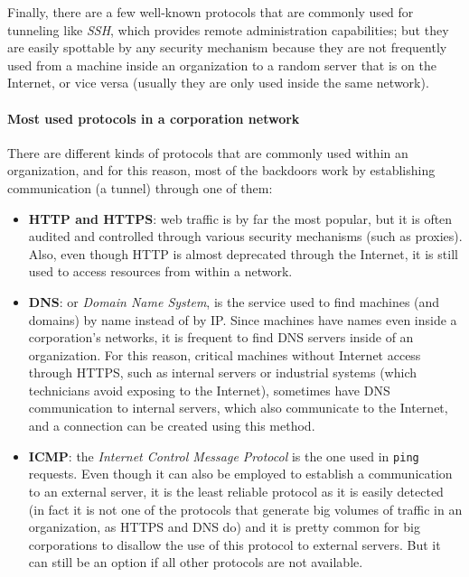 Finally, there are a few well-known protocols that are commonly used for tunneling like \textit{SSH}, which provides remote administration capabilities; but they are easily spottable by any security mechanism because they are not frequently used from a machine inside an organization to a random server that is on the Internet, or vice versa (usually they are only used inside the same network).

\pagebreak
\paragraph{Most used protocols in a corporation network}

There are different kinds of protocols that are commonly used within an organization, and for this reason, most of the backdoors work by establishing communication (a tunnel) through one of them:
\begin{itemize}
\renewcommand{\labelitemi}{\localtextbulletone}
\item \textbf{HTTP and HTTPS}: web traffic is by far the most popular, but it is often audited and controlled through various security mechanisms (such as proxies). Also, even though HTTP is almost deprecated through the Internet, it is still used to access resources from within a network.
\item \textbf{DNS}: or \textit{Domain Name System}, is the service used to find machines (and domains) by name instead of by IP. Since machines have names even inside a corporation's networks, it is frequent to find DNS servers inside of an organization. For this reason, critical machines without Internet access through HTTPS, such as internal servers or industrial systems (which technicians avoid exposing to the Internet), sometimes have DNS communication to internal servers, which also communicate to the Internet, and a connection can be created using this method.  

\pagebreak
\item \textbf{ICMP}: the \textit{Internet Control Message Protocol} is the one used in \texttt{ping} requests. Even though it can also be employed to establish a communication to an external server, it is the least reliable protocol as it is easily detected (in fact it is not one of the protocols that generate big volumes of traffic in an organization, as HTTPS and DNS do) and it is pretty common for big corporations to disallow the use of this protocol to external servers. But it can still be an option if all other protocols are not available.
\end{itemize}


